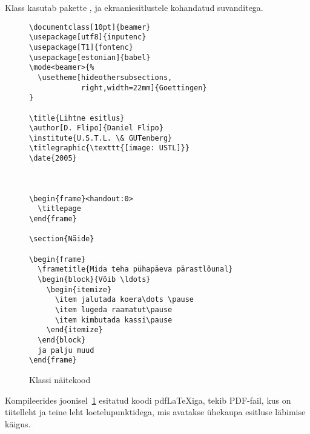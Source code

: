 Klass  kasutab pakette ,  ja
 ekraaniesitlustele kohandatud suvanditega.


\begin{figure}[htbp]
\begin{verbatim}
\documentclass[10pt]{beamer}
\usepackage[utf8]{inputenc}
\usepackage[T1]{fontenc}
\usepackage[estonian]{babel}
\mode<beamer>{%
  \usetheme[hideothersubsections,
            right,width=22mm]{Goettingen}
}

\title{Lihtne esitlus}
\author[D. Flipo]{Daniel Flipo}
\institute{U.S.T.L. \& GUTenberg}
\titlegraphic{\texttt{[image: USTL]}}
\date{2005}



\begin{frame}<handout:0>
  \titlepage
\end{frame}

\section{Näide}

\begin{frame}
  \frametitle{Mida teha pühapäeva pärastlõunal}
  \begin{block}{Võib \ldots}
    \begin{itemize}
      \item jalutada koera\dots \pause
      \item lugeda raamatut\pause
      \item kimbutada kassi\pause
    \end{itemize}
  \end{block}
  ja palju muud
\end{frame}

\end{verbatim}
  \caption{Klassi  näitekood}
  \label{fig:code-beamer}
\end{figure}

Kompileerides joonisel~\ref{fig:code-beamer} esitatud koodi
pdf\LaTeX iga, tekib PDF-fail, kus on tiitelleht ja
teine leht loetelupunktidega, mis avatakse ühekaupa esitluse läbimise
käigus.

